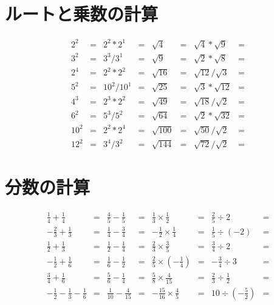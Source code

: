 \documentclass[paper=b4j,landscape,twocolumn,fleqn]{jlreq}
\begin{document}
\section{ルートと乗数の計算}
\begin{align*}
    2^2 &= & 2^2 * 2^1 &= & \sqrt{4} &= & \sqrt{4} * \sqrt{9} &= \\
    3^2 &= & 3^3 / 3^1 &= & \sqrt{9} &= & \sqrt{2} * \sqrt{8} &= \\
    2^4 &= & 2^2 * 2^2 &= & \sqrt{16} &= & \sqrt{12} / \sqrt{3} &= \\
    5^2 &= & 10^2 / 10^1 &= & \sqrt{25} &= & \sqrt{3} * \sqrt{12} &= \\
    4^3 &= & 2^3 * 2^2 &= & \sqrt{49} &= & \sqrt{18} / \sqrt{2} &= \\
    6^2 &= & 5^3 / 5^2 &= & \sqrt{64} &= & \sqrt{2} * \sqrt{32} &= \\
    10^2 &= & 2^2 * 2^4 &= & \sqrt{100} &= & \sqrt{50} / \sqrt{2} &= \\
    12^2 &= & 3^4 / 3^2 &= & \sqrt{144} &= & \sqrt{72} / \sqrt{2} &= 
\end{align*}
\section{分数の計算}
\begin{align*}
    \frac{1}{4} + \frac{1}{4} &= & \frac{4}{5} - \frac{1}{5} &= & \frac{1}{3} \times \frac{1}{2} &= & \frac{2}{5} \div 2 &= \\
    -\frac{2}{3} + \frac{1}{3} &= & \frac{1}{4} - \frac{3}{4} &= & -\frac{1}{2} \times \frac{1}{4} &= & \frac{1}{5} \div (-2) &= \\
    \frac{1}{2} + \frac{1}{3} &= & \frac{1}{2} - \frac{1}{4} &= & \frac{2}{3} \times \frac{3}{5} &= & \frac{3}{4} \div 2 &= \\
    -\frac{1}{2} + \frac{1}{6} &= & \frac{1}{6} - \frac{1}{2} &= & \frac{2}{5} \times \left(-\frac{1}{4}\right) &= & -\frac{3}{4} \div 3 &= \\
    \frac{3}{4} + \frac{1}{6} &= & \frac{5}{6} - \frac{1}{4} &= & \frac{5}{8} \times \frac{4}{15} &= & \frac{2}{3} \div \frac{1}{2} &= \\
    -\frac{1}{2} - \frac{1}{3} - \frac{1}{6} &= & \frac{1}{10} - \frac{4}{15} &= & -\frac{15}{16} \times \frac{4}{5} &= & 10 \div \left(-\frac{5}{2}\right) &= 
\end{align*}
\end{document}
